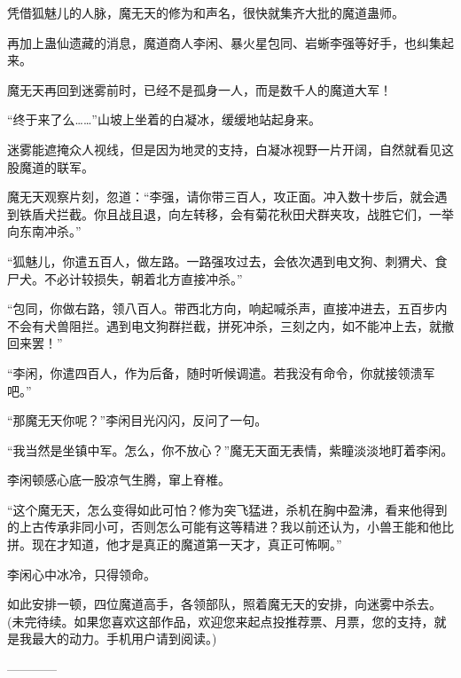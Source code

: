 \begin{this_body}
凭借狐魅儿的人脉，魔无天的修为和声名，很快就集齐大批的魔道蛊师。

再加上蛊仙遗藏的消息，魔道商人李闲、暴火星包同、岩蜥李强等好手，也纠集起来。

魔无天再回到迷雾前时，已经不是孤身一人，而是数千人的魔道大军！

“终于来了么……”山坡上坐着的白凝冰，缓缓地站起身来。

迷雾能遮掩众人视线，但是因为地灵的支持，白凝冰视野一片开阔，自然就看见这股魔道的联军。

魔无天观察片刻，忽道：“李强，请你带三百人，攻正面。冲入数十步后，就会遇到铁盾犬拦截。你且战且退，向左转移，会有菊花秋田犬群夹攻，战胜它们，一举向东南冲杀。”

“狐魅儿，你遣五百人，做左路。一路强攻过去，会依次遇到电文狗、刺猬犬、食尸犬。不必计较损失，朝着北方直接冲杀。”

“包同，你做右路，领八百人。带西北方向，响起喊杀声，直接冲进去，五百步内不会有犬兽阻拦。遇到电文狗群拦截，拼死冲杀，三刻之内，如不能冲上去，就撤回来罢！”

“李闲，你遣四百人，作为后备，随时听候调遣。若我没有命令，你就接领溃军吧。”

“那魔无天你呢？”李闲目光闪闪，反问了一句。

“我当然是坐镇中军。怎么，你不放心？”魔无天面无表情，紫瞳淡淡地盯着李闲。

李闲顿感心底一股凉气生腾，窜上脊椎。

“这个魔无天，怎么变得如此可怕？修为突飞猛进，杀机在胸中盈沸，看来他得到的上古传承非同小可，否则怎么可能有这等精进？我以前还认为，小兽王能和他比拼。现在才知道，他才是真正的魔道第一天才，真正可怖啊。”

李闲心中冰冷，只得领命。

如此安排一顿，四位魔道高手，各领部队，照着魔无天的安排，向迷雾中杀去。(未完待续。如果您喜欢这部作品，欢迎您来起点投推荐票、月票，您的支持，就是我最大的动力。手机用户请到阅读。)

------------

\end{this_body}

